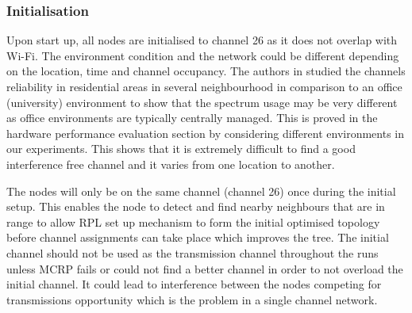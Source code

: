 \subsubsection{Initialisation}

Upon start up, all nodes are initialised to channel 26 as it does not overlap with Wi-Fi. 
The environment condition and the network could be different depending on the location, time and channel occupancy. 
The authors in \cite{homearea} studied the channels reliability in residential areas in several neighbourhood in comparison to an office (university) environment to show that the spectrum usage may be very different as office environments are typically centrally managed. This is proved in the hardware performance evaluation section by considering different environments in our experiments.
This shows that it is extremely difficult to find a good interference free channel and it varies from one location to another.


The nodes will only be on the same channel (channel 26) once during the initial setup.
This enables the node to detect and find nearby neighbours that are in range to allow RPL set up mechanism to form the initial optimised topology before channel assignments can take place which improves the tree.
The initial channel should not be used as the transmission channel throughout the runs unless MCRP fails or could not find a better channel in order to not overload the initial channel.
It could lead to interference between the nodes competing for transmissions opportunity which is the problem in a single channel network. 

